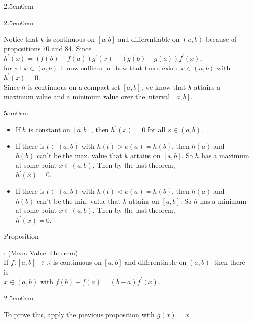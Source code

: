 \documentclass{book}
\newcommand{\hThree}{%
   \color{PineGreen!85!Orange}
   \fontsize{13}{15}\selectfont%
}
\newenvironment{myIndent}{%
   \begin{adjustwidth}{2.5em}{0em}%
}{%
   \end{adjustwidth}%
}
\newenvironment{myDindent}{%
   \begin{adjustwidth}{5em}{0em}%
}{%
   \end{adjustwidth}%
}
\newcounter{PropNumber}
\newcommand{\propCount}[1][1]{%
   \addtocounter{PropNumber}{#1}%
   \thePropNumber%
}
\newcommand{\retTwo}{\hfill\bigbreak}
\begin{document}
{\begin{myIndent}
{\begin{myIndent}
      Notice that $h$ is continuous on $[a, b]$ and differentiable on $(a, b)$ because of\\ propositions 70 and 84. Since $h^\prime(x) = (f(b) - f(a))g^\prime(x) - (g(b) - g(a))f^\prime(x)$,\\ for all $x \in (a, b)$ it now suffices to show that there exists $x \in (a, b)$ with\\ $h^\prime(x) = 0$.\\
      
      Since $h$ is continuous on a compact set $[a, b]$, we know that $h$ attains a\\ maximum value and a minimum value over the interval $[a, b]$.
      \begin{myDindent}
         \begin{itemize}
            \item[Case 1:] If $h$ is constant on $[a, b]$, then $h^\prime(x) = 0$ for all $x \in (a, b)$.\\ [-8pt]
            \item[Case 2:] If there is $t \in (a, b)$ with $h(t) > h(a) = h(b)$, then $h(a)$ and\\ $h(b)$ can't be the max. value that $h$ attains on $[a, b]$. So $h$ has a maximum at some point $x \in (a, b)$. Then by the last theorem,\\ $h^\prime(x) = 0$.
            \item[Case 3:] If there is $t \in (a, b)$ with $h(t) < h(a) = h(b)$, then $h(a)$ and\\ $h(b)$ can't be the min. value that $h$ attains on $[a, b]$. So $h$ has a minimum at some point $x \in (a, b)$. Then by the last theorem,\\ $h^\prime(x) = 0$.
         \end{itemize}
      \end{myDindent}
   \end{myIndent}}

   \newpage

   Proposition \propCount: (Mean Value Theorem)\\
   If $f: [a, b] \longrightarrow \mathbb{R}$ is continuous on $[a, b]$ and differentiable on $(a, b)$, then there is\\ $x \in (a, b)$ with $f(b) - f(a) = (b - a)f^\prime(x)$.\retTwo
   
   {\begin{myIndent} \hThree
      To prove this, apply the previous proposition with $g(x) = x$.\retTwo
   \end{myIndent}}


\end{myIndent}}
\end{document}
